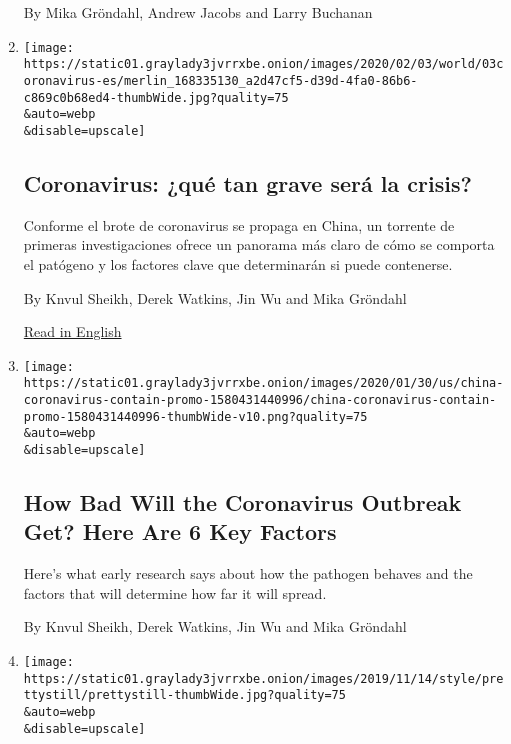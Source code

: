 \begin{enumerate}
  By Mika Gröndahl, Andrew Jacobs and Larry Buchanan
\item
  \href{/es/2020/02/04/espanol/mundo/coronavirus-vacuna-viaje.html}{}

  \texttt{[image: https://static01.graylady3jvrrxbe.onion/images/2020/02/03/world/03coronavirus-es/merlin\_168335130\_a2d47cf5-d39d-4fa0-86b6-c869c0b68ed4-thumbWide.jpg?quality=75\\\&auto=webp\\\&disable=upscale]}

  \hypertarget{coronavirus-quuxe9-tan-grave-seruxe1-la-crisis}{%
  \subsection{Coronavirus: ¿qué tan grave será la
  crisis?}\label{coronavirus-quuxe9-tan-grave-seruxe1-la-crisis}}

  Conforme el brote de coronavirus se propaga en China, un torrente de
  primeras investigaciones ofrece un panorama más claro de cómo se
  comporta el patógeno y los factores clave que determinarán si puede
  contenerse.

  By Knvul Sheikh, Derek Watkins, Jin Wu and Mika Gröndahl

  \href{https://www.nytimes3xbfgragh.onion/interactive/2020/world/asia/china-coronavirus-contain.html}{Read
  in English}
\item
  \href{/interactive/2020/world/asia/china-coronavirus-contain.html}{}

  \texttt{[image: https://static01.graylady3jvrrxbe.onion/images/2020/01/30/us/china-coronavirus-contain-promo-1580431440996/china-coronavirus-contain-promo-1580431440996-thumbWide-v10.png?quality=75\\\&auto=webp\\\&disable=upscale]}

  \hypertarget{how-bad-will-the-coronavirus-outbreak-get-here-are-6-key-factors}{%
  \subsection{How Bad Will the Coronavirus Outbreak Get? Here Are 6 Key
  Factors}\label{how-bad-will-the-coronavirus-outbreak-get-here-are-6-key-factors}}

  Here's what early research says about how the pathogen behaves and the
  factors that will determine how far it will spread.

  By Knvul Sheikh, Derek Watkins, Jin Wu and Mika Gröndahl
\item
  \href{/interactive/2019/11/14/style/possessed-kara-walker.html}{}

  \texttt{[image: https://static01.graylady3jvrrxbe.onion/images/2019/11/14/style/prettystill/prettystill-thumbWide.jpg?quality=75\\\&auto=webp\\\&disable=upscale]}


\end{enumerate}
